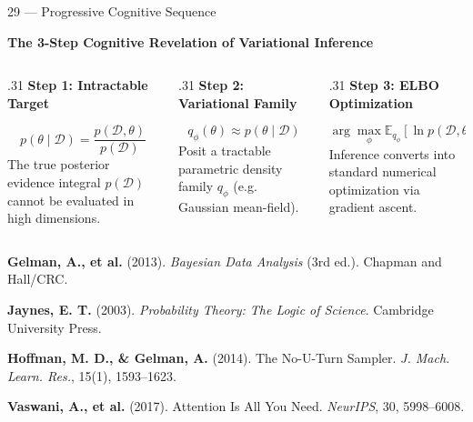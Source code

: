 \documentclass[aspectratio=169,10pt]{beamer}
\begin{document}
\begin{frame}{29 — Progressive Cognitive Sequence}
  \begin{center}
    {\small\bfseries\color{BayesTeal}The 3-Step Cognitive Revelation of Variational Inference}\par\vspace{.25cm}
  \end{center}
  \begin{columns}[T,onlytextwidth]
    \begin{column}{.31\textwidth}
      {\small\bfseries Step 1: Intractable Target}\par\vspace{.06cm}
      \[
        p(\theta \mid \mathcal{D}) = \frac{p(\mathcal{D}, \theta)}{p(\mathcal{D})}
      \]
      {\scriptsize The true posterior evidence integral $p(\mathcal{D})$ cannot be evaluated in high dimensions.}
    \end{column}
    \hfill
    \begin{column}{.31\textwidth}
      {\small\bfseries Step 2: Variational Family}\par\vspace{.06cm}
      \[
        q_\phi(\theta) \approx p(\theta \mid \mathcal{D})
      \]
      {\scriptsize Posit a tractable parametric density family $q_\phi$ (e.g. Gaussian mean-field).}
    \end{column}
    \hfill
    \begin{column}{.31\textwidth}
      {\small\bfseries Step 3: ELBO Optimization}\par\vspace{.06cm}
      \[
        \arg\max_\phi \mathbb{E}_{q_\phi}[\ln p(\mathcal{D},\theta)] - \mathrm{KL}
      \]
      {\scriptsize Inference converts into standard numerical optimization via gradient ascent.}
    \end{column}
  \end{columns}
  \vfill
\end{frame}

\begin{References}
  \item \textbf{Gelman, A., et al.} (2013). \emph{Bayesian Data Analysis} (3rd ed.). Chapman and Hall/CRC.
  \item \textbf{Jaynes, E. T.} (2003). \emph{Probability Theory: The Logic of Science}. Cambridge University Press.
  \item \textbf{Hoffman, M. D., \& Gelman, A.} (2014). The No-U-Turn Sampler. \emph{J. Mach. Learn. Res.}, 15(1), 1593--1623.
  \item \textbf{Vaswani, A., et al.} (2017). Attention Is All You Need. \emph{NeurIPS}, 30, 5998--6008.
\end{References}
\end{document}
